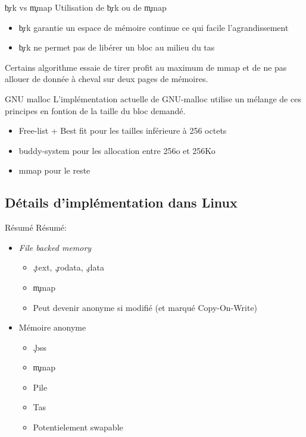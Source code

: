 \begin{frame}[fragile=singleslide]{\c{brk} vs \c{mmap}}
  Utilisation de \c{brk} ou de \c{mmap}
  \begin{itemize}
  \item \c{brk} garantie  un espace de mémoire continue  ce qui facile
    l'agrandissement
  \item \c{brk} ne permet pas de libérer un bloc au milieu du tas
  \end{itemize}
  Certains algorithme essaie de tirer  profit au maximum de mmap et de
  ne pas allouer de donnée à cheval sur deux pages de mémoires.
\end{frame}

\begin{frame}[fragile=singleslide]{GNU malloc}
  L'implémentation actuelle de  GNU-malloc utilise un mélange de
  ces principes en fontion de la taille du bloc demandé.
  \begin{itemize}
  \item Free-list + Best fit pour les tailles inférieure à 256 octets
  \item buddy-system pour les allocation entre 256o et 256Ko
  \item mmap pour le reste
  \end{itemize}
\end{frame}

\subsection{Détails d'implémentation dans Linux}

\begin{frame}[fragile=singleslide]{Résumé}
  Résumé:
  \begin{itemize}
  \item \emph{File backed memory}
    \begin{itemize}
    \item \c{.text}, \c{.rodata}, \c{.data}
    \item \c{mmap}
    \item Peut devenir anonyme si modifié (et marqué Copy-On-Write)
    \end{itemize}
  \item Mémoire anonyme
    \begin{itemize}
    \item \c{.bss}
    \item \c{mmap}
    \item Pile
    \item Tas
    \item Potentielement swapable
    \end{itemize}
  \end{itemize}
\end{frame}

